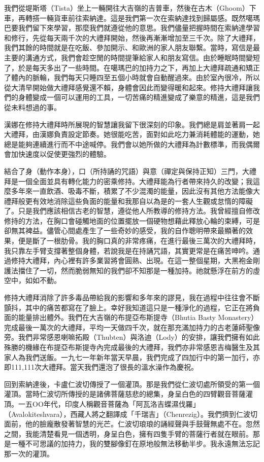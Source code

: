 我們從堤斯塔（Tista）坐上一輛開往大吉嶺的吉普車，然後在古木（Ghoom）下車，再轉搭一輛貨車前往索納達。這是我們第一次在索納達找到歸屬感。既然噶瑪巴要我們留下來學習，那麼我們就遵從他的意思。我們儘量把握時間在索納達學習和修行，先從每天兩千次的大禮拜開始，然後再漸漸增加至三千次。除了大禮拜，我們其餘的時間就是在吃飯、參加開示、和歐洲的家人朋友聯繫。當時，寫信是最主要的溝通方式，我們會趁空閒的時間提筆給家人和朋友寫信。由於睡眠時間變短了，於是每天多出了一些時間。在噶瑪巴的加持力之下，再加上大禮拜疏通和矯正了體內的脈輪，我們每天只睡四至五個小時就會自動醒過來。由於室內很冷，所以從大清早開始做大禮拜感覺還不賴，身體會因此而變得暖和起來。修持大禮拜讓我們的身體變成一個可以運用的工具，一切苦痛的精進變成了樂意的精進，這是我們從未料想過的事。

漢娜在修持大禮拜時所展現的智慧讓我留下很深刻的印象。我們總是肩並著肩一起大禮拜，由漢娜負責設定節奏。她很能吃苦，面對如此吃力兼消耗體能的運動，她總是能夠連續進行而不中途喊停。我們會以她所做的大禮拜為計數標準，而我偶爾會加快速度以促使更強烈的體驗。

結合了身（動作本身），口（所持誦的咒語）與意（禪定與保持正知）三門，大禮拜是一個全面並具有轉化能力的密乘修持。大禮拜能為行者帶來持久的改變；我這麼多年來一直飲酒、吸毒不斷，積累了不少混濁的能量，因此沒有其他方法能像大禮拜般更有效地消除這些負面的能量和我那自以為是的一套人生觀或怠惰的障礙了。只是我們應該相信古老的智慧，遵從他人所教導的修持方法。我曾經擅自修改修持的方法，在胸口會碰觸地面的位置擺放一個硬物想藉此釋放心輪的束縛，可是卻無其裨益。儘管心間處產生了一些奇妙的感受，我的自作聰明帶來最顯著的效果，便是斷了一根肋骨。我的胸口真的非常疼痛，在進行最後三萬次的大禮拜時，我只靠左手臂支撐著整個身體，若說我是在持誦咒語，其實更常是在痛苦呻吟。通過修持大禮拜，內心裡有許多業習將會圓熟、出現。在這一整個星期，大黑袍金剛護法擋住了一切，然而脆弱無知的我們卻不知那是一種加持。祂就懸浮在前方的虛空中，如如不動。

修持大禮拜消除了許多毒品帶給我的影響和多年來的謬見，我在過程中往往會不斷顫抖，其中的痛苦都寫在了臉上。幸好我知道這只是一種淨化的過程，它正在將負面的能量排出體外。我們在大吉嶺的布提亞布斯提寺（Bhutia
Basty
Monastery）完成最後一萬次的大禮拜，平均一天做四千次，就在那充滿加持力的古老蓮師聖像旁。我們非常感恩喇嘛拓殿（Thubten）與洛迪（Lody）的安排，讓我們擁有如此殊勝的機緣在布提亞布斯提寺內完成最後的大禮拜，我們亦非常感恩吉梅醫生及其家人為我們送飯。一九七一年新年當天早晨，我們完成了四加行中的第一加行，亦即111,111次大禮拜。當天我們還泡了很長的溫水澡作為慶祝。

回到索納達後，卡盧仁波切傳授了一個灌頂。那是我們從仁波切處所領受的第一個灌頂。當時仁波切所傳授的是諸佛菩薩慈悲的總集，身呈白色的四臂觀音菩薩灌頂。一五ΟΟ年代，印度人稱觀音菩薩為「阿瓦洛吉蝶濕伐羅」（Avalokiteshvara），西藏人將之翻譯成「千瑞吉」（Chenrezig）。我們擠到仁波切面前，他的臉龐散發著智慧的光芒。仁波切琅琅的誦經聲與手鼓聲無處不在。忽然之間，我能清楚看見一個透明，身呈白色，擁有四隻手臂的菩薩行者就在眼前。那是一種不可思議的加持力，我的雙腳像釘在原地般無法移動半步。我永遠無法忘記那一次的灌頂。

